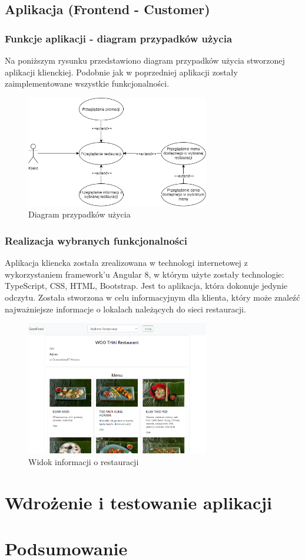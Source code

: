 \documentclass{article}
\begin{document}
	\newpage
	\subsection{Aplikacja (Frontend - Customer)}

		\subsubsection{Funkcje aplikacji - diagram przypadków użycia}
		Na poniższym rysunku przedstawiono diagram przypadków użycia stworzonej aplikacji klienckiej. Podobnie jak w poprzedniej aplikacji zostały zaimplementowane wszystkie funkcjonalności.
			\begin{figure}[hbt!]
				\includegraphics[width=8cm]{Files/Pictures/UMLCustomerApp}
				\centering
				\caption{Diagram przypadków użycia}
			\end{figure}
		\subsubsection{Realizacja wybranych funkcjonalności}	
		Aplikacja kliencka została zrealizowana w technologi internetowej z wykorzystaniem framework'u Angular 8, w którym użyte zostały technologie:  TypeScript, CSS, HTML, Bootstrap.
		Jest to aplikacja, która dokonuje jedynie odczytu. Została stworzona w celu informacyjnym dla klienta, który może znaleźć najważniejsze informacje o lokalach należących do sieci restauracji.
			\begin{figure}[hbt!]
				\includegraphics[width=8cm]{Files/Pictures/Info_C}
				\centering
				\caption{Widok informacji o restauracji}
			\end{figure}
\newpage
\section{Wdrożenie i testowanie aplikacji}

\section{Podsumowanie}
 
\end{document}
